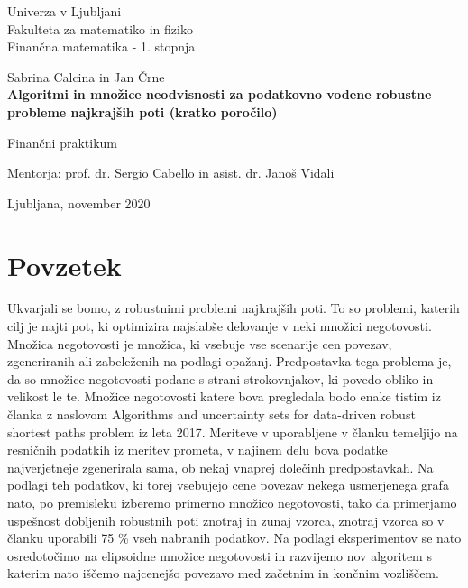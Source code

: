 \documentclass[a4paper, 12 pt]{article}
\theoremstyle{plain}
\theoremstyle{definition}
\theoremstyle{remark}
\begin{document}
\begin{titlepage}
		\begin{center}
		
		\large
		Univerza v Ljubljani\\
		\normalsize
		Fakulteta za matematiko in fiziko\\
		
		\small
		Finančna matematika - 1. stopnja\\
		
		\vspace{5 cm} 
		
		\large
		Sabrina Calcina in Jan Črne \\
		
		\vspace{0.5cm}
		\Large
		\textbf{Algoritmi in množice neodvisnosti za podatkovno vodene robustne probleme najkrajših poti  (kratko poročilo)}
		
		\vspace{0.5 cm}
		\normalsize
		Finančni praktikum
		
		\vspace{1.5cm}
		\normalsize
		Mentorja: prof. dr. Sergio Cabello in asist. dr. Janoš Vidali
		
		\vfill
		
		\large Ljubljana, november 2020
		
		\end{center}
\end{titlepage}

\section{Povzetek}

Ukvarjali se bomo, z  robustnimi problemi najkrajših poti. To so problemi, katerih cilj je najti pot, ki optimizira najslabše delovanje v neki množici negotovosti. Množica negotovosti je množica, ki vsebuje vse scenarije cen povezav, zgeneriranih ali zabeleženih na podlagi opažanj.
Predpostavka tega problema je, da so množice negotovosti podane s strani strokovnjakov, ki povedo obliko in velikost le te.
Množice negotovosti katere bova pregledala bodo enake tistim iz članka z naslovom Algorithms and uncertainty sets for data-driven robust shortest paths problem iz leta 2017. Meriteve v uporabljene v članku temeljijo na resničnih podatkih iz meritev prometa, v najinem delu bova podatke najverjetneje zgenerirala sama, ob nekaj vnaprej dolečinh predpostavkah. Na podlagi teh podatkov, ki torej vsebujejo cene povezav nekega usmerjenega grafa nato, po premisleku izberemo primerno množico negotovosti, tako da primerjamo uspešnost dobljenih robustnih poti znotraj in zunaj vzorca, znotraj vzorca so v članku uporabili 75 \% vseh nabranih podatkov. 
Na podlagi eksperimentov se nato osredotočimo na elipsoidne množice negotovosti in razvijemo nov algoritem s katerim nato iščemo najcenejšo povezavo med začetnim in končnim vozliščem.
\end{document}

